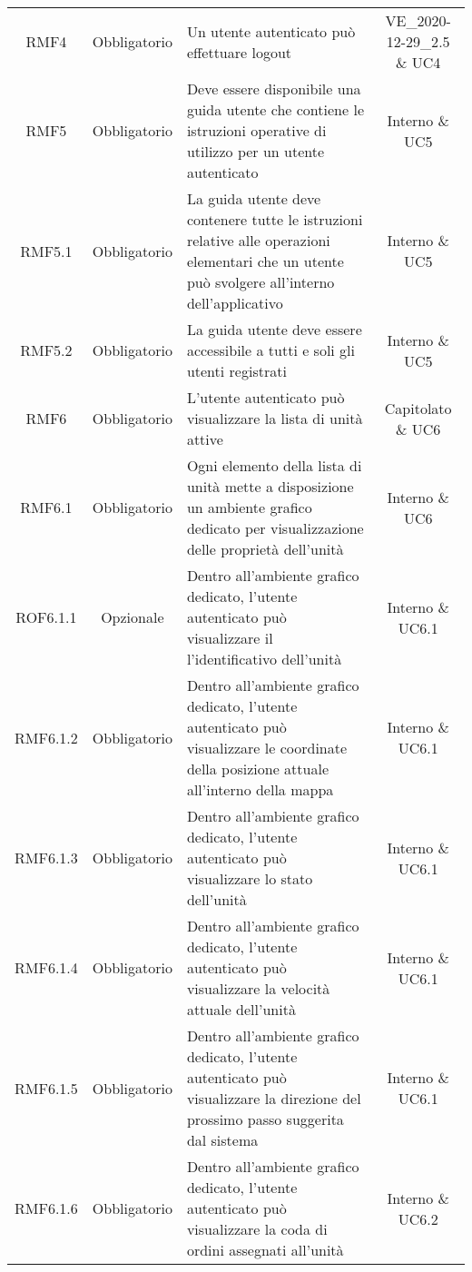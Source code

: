 \begin{longtable}[h!] { c c m{8cm} c}
		RMF4 & Obbligatorio & Un utente autenticato può effettuare logout & VE\_2020-12-29\_2.5 \& UC4 \\

		RMF5 & Obbligatorio & Deve essere disponibile una guida utente che contiene le istruzioni operative di utilizzo per un utente autenticato & Interno \& UC5 \\

		RMF5.1 & Obbligatorio & La guida utente deve contenere tutte le istruzioni relative alle operazioni elementari che un utente può svolgere all'interno dell'applicativo & Interno \& UC5 \\

		RMF5.2 & Obbligatorio & La guida utente deve essere accessibile a tutti e soli gli utenti registrati & Interno \& UC5 \\

		RMF6 & Obbligatorio & L'utente autenticato può visualizzare la lista di unità attive & Capitolato \& UC6 \\

		RMF6.1 & Obbligatorio & Ogni elemento della lista di unità mette a disposizione un ambiente grafico dedicato per visualizzazione delle proprietà dell'unità & Interno \& UC6 \\

		ROF6.1.1 & Opzionale & Dentro all'ambiente grafico dedicato, l'utente autenticato può visualizzare il l'identificativo dell'unità & Interno \& UC6.1 \\

		RMF6.1.2 & Obbligatorio & Dentro all'ambiente grafico dedicato, l'utente autenticato può visualizzare le coordinate della posizione attuale all'interno della mappa & Interno \& UC6.1 \\

		RMF6.1.3 & Obbligatorio &  Dentro all'ambiente grafico dedicato, l'utente autenticato può visualizzare lo stato dell'unità & Interno \& UC6.1 \\

		RMF6.1.4 & Obbligatorio &  Dentro all'ambiente grafico dedicato, l'utente autenticato può visualizzare la velocità attuale dell'unità & Interno \& UC6.1 \\

		RMF6.1.5 & Obbligatorio &  Dentro all'ambiente grafico dedicato, l'utente autenticato può visualizzare la direzione del prossimo passo suggerita dal sistema & Interno \& UC6.1 \\

		RMF6.1.6 & Obbligatorio &  Dentro all'ambiente grafico dedicato, l'utente autenticato può visualizzare la coda di ordini assegnati all'unità & Interno \& UC6.2 \\


\end{longtable}
